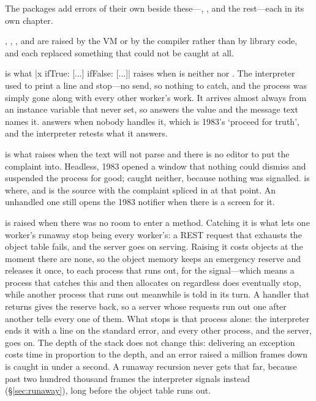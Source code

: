 The packages add errors of their own beside these---,
,  and the rest---each in its own chapter.

, , ,
 and  are raised by the VM or by
the compiler rather than by library code, and each replaced something that
could not be caught at all.

 is what \ct|x ifTrue: [...] ifFalse: [...]| raises
when  is neither  nor . The interpreter used to
print a line and stop---no send, so nothing to catch, and the process was
simply gone along with every other worker's work. It arrives almost always
from an instance variable that  never set, so  answers
the value and the message text names it.  answers
 when nobody handles it, which is 1983's `proceed for truth', and
the interpreter retests what it answers.

 is what  raises when the
text will not parse and there is no editor to put the complaint into.
Headless, 1983 opened a window that nothing could dismiss and suspended the
process for good;  caught neither, because nothing was
signalled.  is where, and  is the source
with the complaint spliced in at that point. An unhandled one still opens
the 1983 notifier when there is a screen for it.

 is raised when there was no room to enter a method. Catching
it is what lets one worker's runaway stop being every worker's: a REST
request that exhausts the object table fails, and the server goes on serving.
Raising it costs objects at the moment there are none, so the object memory
keeps an emergency reserve and releases it once, to each process that runs
out, for the signal---which means a process that catches this and then
allocates on regardless does eventually stop, while another process that runs
out meanwhile is told in its turn. A handler that returns gives the
reserve back, so a server whose requests run out one after another tells
every one of them. What stops is that process alone: the
interpreter ends it with a line on the standard error, and every other
process, and the server, goes on. The depth of the stack does not change
this: delivering an exception costs time in proportion to the depth, and an
error raised a million frames down is caught in under a second. A runaway
recursion never gets that far, because past two hundred thousand frames the
interpreter signals  instead (\S\ref{sec:runaway}),
long before the object table runs out.

